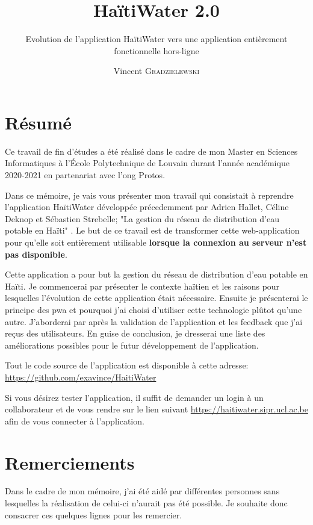 \documentclass{EPL-master-thesis-covers-FR}
\title{HaïtiWater 2.0}
\subtitle{Evolution de l'application HaïtiWater vers une application entièrement fonctionnelle hors-ligne}
\author{Vincent \textsc{Gradzielewski}}%
\begin{document}
	\maketitle
	\tableofcontents

	\setlength{\parskip}{1.5em plus1em minus1em}


	\chapter*{Résumé}
	
	
		Ce travail de fin d'études a été réalisé dans le cadre de mon Master en Sciences Informatiques à l'École Polytechnique de Louvain durant l'année académique 2020-2021 en partenariat avec l'\gls{ong} Protos.
		
		Dans ce mémoire, je vais vous présenter mon travail qui consistait à reprendre l'application HaïtiWater développée précedemment par Adrien Hallet, Céline Deknop et Sébastien Strebelle; "La gestion du réseau de distribution d'eau potable en Haïti" \cite{ref:haitiwater}. Le but de ce travail est de transformer cette web-application pour qu'elle soit entièrement utilisable \textbf{lorsque la connexion au serveur n'est pas disponible}.
	
		Cette application a pour but la gestion du réseau de distribution d'eau potable en Haïti. Je commencerai par présenter le contexte haïtien et les raisons pour lesquelles l'évolution de cette application était nécessaire. Ensuite je présenterai le principe des \gls{pwa} et pourquoi j'ai choisi d'utiliser cette technologie plûtot qu'une autre. J'aborderai par après la validation de l'application et les feedback que j'ai reçus des utilisateurs. En guise de conclusion, je dresserai une liste des améliorations possibles pour le futur développement de l'application.

		Tout le code source de l'application est disponible à cette adresse:\\ \url{https://github.com/exavince/HaitiWater}

		Si vous désirez tester l'application, il suffit de demander un login à un collaborateur et de vous rendre sur le lien suivant \url{https://haitiwater.sipr.ucl.ac.be} afin de vous connecter à l'application.
		

	\chapter*{Remerciements}
		Dans le cadre de mon mémoire, j'ai été aidé par différentes personnes sans lesquelles la réalisation de celui-ci n'aurait pas été possible. Je souhaite donc consacrer ces quelques lignes pour les remercier.
		
\end{document}
